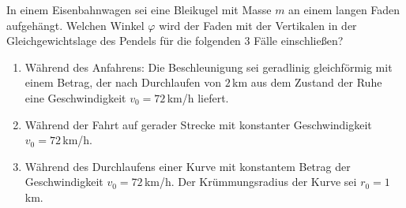 \begin{ExerciseBlock}
In einem Eisenbahnwagen sei eine Bleikugel mit Masse $m$ an einem langen Faden aufgehängt. Welchen Winkel $\varphi$ wird der Faden mit der Vertikalen in der Gleichgewichtslage des Pendels für die folgenden 3 Fälle einschließen?

\begin{enumerate}
	\item Während des Anfahrens: Die Beschleunigung sei geradlinig gleichförmig mit einem Betrag, der nach Durchlaufen von $2\,$km aus dem Zustand der Ruhe eine Geschwindigkeit $v_0 = 72\,$km/h liefert.

	\item Während der Fahrt auf gerader Strecke mit konstanter Geschwindigkeit $v_0 = 72\,$km/h.

	\item Während des Durchlaufens einer Kurve mit konstantem Betrag der Geschwindigkeit $v_0 = 72\,$km/h. Der Krümmungsradius der Kurve sei $r_0 = 1\,$km.

\end{enumerate}
\end{ExerciseBlock}
